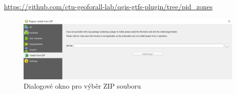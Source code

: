 \href{https://github.com/ctu-geoforall-lab/qgis-gtfs-plugin/tree/pid\_zones}
{https://github.com/ctu-geoforall-lab/qgis-gtfs-plugin/tree/pid\_zones}

\begin{figure}[H] \centering
    \includegraphics[width=400pt]{./pictures-dodatek/zip.png}
    \caption[Dialogové okno pro výběr ZIP souboru]{Dialogové okno pro výběr ZIP souboru}
	\label{fig:zip}              
\end{figure} 


